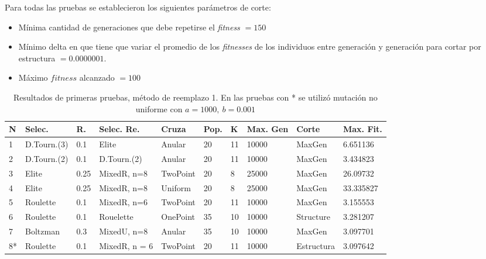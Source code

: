 \documentclass[11pt,a4paper]{article}
\begin{document}
Para todas las pruebas se establecieron los siguientes parámetros de corte:
\begin{itemize}
\item Mínima cantidad de generaciones que debe repetirse el \emph{fitness} $=150$
\item Mínimo delta en que tiene que variar el promedio de los \emph{fitnesses} de los individuos entre generación y generación para cortar por estructura $=0.0000001$.
\item Máximo $fitness$ alcanzado $=100$
\end{itemize}


\begin{table}[h]
\centering
\hspace*{-0.9cm}
\begin{tabular}{|l|l|l|l|l|l|l|l|l|l|}
\hline
N & Selec. & R. & Selec. Re. & Cruza & Pop. & K & Max. Gen & Corte & Max. Fit. \\ \hline
1 & D.Tourn.(3) & 0.1 & Elite & Anular & 20 & 11 & 10000 & MaxGen & 6.651136 \\ \hline
2 & D.Tourn.(2) & 0.1 & D.Tourn.(2) & Anular & 20 & 11 & 10000 & MaxGen & 3.434823 \\ \hline
3 & Elite & 0.25 & MixedR, n=8 & TwoPoint & 20 & 8 & 25000 & MaxGen & 26.09732 \\ \hline
4 & Elite & 0.25 & MixedR, n=8 & Uniform & 20 & 8 & 25000 & MaxGen & 33.335827 \\ \hline
5 & Roulette & 0.1 & MixedR, n=6 & TwoPoint & 20 & 11 & 10000 & MaxGen & 3.155553 \\ \hline
6 & Roulette & 0.1 & Rouelette & OnePoint & 35 & 10 & 10000 & Structure & 3.281207 \\ \hline
7 & Boltzman & 0.3 & MixedU, n=8 & Anular & 35 & 10 & 10000 & MaxGen & 3.097701 \\ \hline
8* & Roulette & 0.1 & MixedR, n = 6 & TwoPoint & 20 & 11 & 10000 & Estructura & 3.097642 \\ \hline

\end{tabular}
\caption{Resultados de primeras pruebas, método de reemplazo 1. En las pruebas con * se utilizó mutación no uniforme con $a=1000, \ b =0.001$}
\label{table:prueba1-met1}
\end{table}
\end{document}
